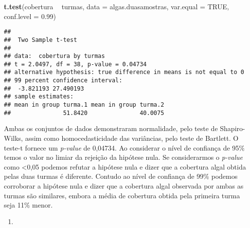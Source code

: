 \documentclass[14pt,titlepage, oneside, openany, a4paper]{book}
\newenvironment{Shaded}{\begin{snugshade}}{\end{snugshade}}
\newcommand{\DataTypeTok}[1]{\textcolor[rgb]{0.13,0.29,0.53}{#1}}
\newcommand{\FloatTok}[1]{\textcolor[rgb]{0.00,0.00,0.81}{#1}}
\newcommand{\KeywordTok}[1]{\textcolor[rgb]{0.13,0.29,0.53}{\textbf{#1}}}
\newcommand{\NormalTok}[1]{#1}
\newcommand{\OperatorTok}[1]{\textcolor[rgb]{0.81,0.36,0.00}{\textbf{#1}}}
\newcommand{\OtherTok}[1]{\textcolor[rgb]{0.56,0.35,0.01}{#1}}
\newcommand{\StringTok}[1]{\textcolor[rgb]{0.31,0.60,0.02}{#1}}
\begin{document}
\begin{Shaded}
\begin{Highlighting}[]
\KeywordTok{t.test}\NormalTok{(cobertura }\OperatorTok{~}\StringTok{ }\NormalTok{turmas, }
       \DataTypeTok{data =}\NormalTok{ algas.duasamostras,}
       \DataTypeTok{var.equal =} \OtherTok{TRUE}\NormalTok{,}
       \DataTypeTok{conf.level =} \FloatTok{0.99}\NormalTok{)}
\end{Highlighting}
\end{Shaded}

\begin{verbatim}
## 
##  Two Sample t-test
## 
## data:  cobertura by turmas
## t = 2.0497, df = 38, p-value = 0.04734
## alternative hypothesis: true difference in means is not equal to 0
## 99 percent confidence interval:
##  -3.821193 27.490193
## sample estimates:
## mean in group turma.1 mean in group turma.2 
##               51.8420               40.0075
\end{verbatim}

Ambas os conjuntos de dados demonstraram normalidade, pelo teste de Shapiro-Wilks, assim como homocedasticidade das variâncias, pelo teste de Bartlett. O teste-t fornece um \emph{p-value} de 0,04734.
Ao considerar o nível de confiança de 95\% temos o valor no limiar da rejeição da hipótese nula. Se considerarmos o \emph{p-value} como \textless{}0,05 podemos refutar a hipótese nula e dizer que a cobertura algal obtida pelas duas turmas é diferente. Contudo ao nível de confiança de 99\% podemos corroborar a hipótese nula e dizer que a cobertura algal observada por ambas as turmas são similares, embora a média de cobertura obtida pela primeira turma seja 11\% menor.

\begin{enumerate}
\def\labelenumi{\arabic{enumi})}
\setcounter{enumi}{3}
\item
\end{enumerate}
\end{document}
